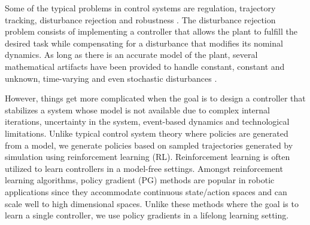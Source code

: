 \documentclass{aamas2016}
\begin{document}
Some of the typical problems in control systems are regulation, trajectory tracking, disturbance rejection and robustness \cite{Khalil-2002, Lewis-2012,Nise-2010}. %
The disturbance rejection problem consists of implementing a controller that allows the plant to fulfill the desired task while compensating
for a disturbance that modifies its nominal dynamics. As long as there is an accurate model of the plant, several mathematical
artifacts have been provided to handle constant, constant and unknown, time-varying and even stochastic disturbances 
\cite{Dorato-2000,Khalil-2002,Lewis-2012}. 

However, things get more complicated when the goal is to design a controller that stabilizes a system whose model is not available due to complex internal iterations, uncertainty in the system, event-based dynamics and technological limitations. %
Unlike typical control system theory where policies are generated from a model, we generate policies based on sampled trajectories generated by simulation using reinforcement learning (RL).
Reinforcement learning \cite{kober2013reinforcement} is often utilized to learn controllers in a model-free settings. Amongst reinforcement learning algorithms, policy gradient (PG) methods \cite{sutton1999policy,williams1992simple} are popular in robotic applications \cite{kober2009policy,peters2008natural} since they accommodate continuous state/action spaces and can scale well to high dimensional spaces. Unlike these methods where the goal is to learn a single controller, we use policy gradients in a lifelong learning setting.

\end{document}
